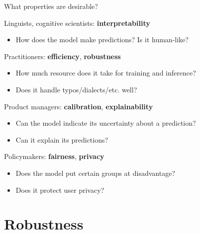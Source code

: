 \documentclass[usenames,dvipsnames,notes,11pt,aspectratio=169,hyperref={colorlinks=true, linkcolor=blue}]{beamer}
\begin{document}
\begin{frame}
    {What properties are desirable?}

    Linguists, cognitive scientists: \textbf{interpretability}\\
    \begin{itemize}
        \item How does the model make predictions? Is it human-like?
    \end{itemize}
    \pause

    Practitioners: \textbf{efficiency}, \textbf{robustness}\\
    \begin{itemize}
        \item How much resource does it take for training and inference?
        \item Does it handle typos/dialects/etc. well?
    \end{itemize}
    \pause

    Product managers: \textbf{calibration}, \textbf{explainability}\\
    \begin{itemize}
        \item Can the model indicate its uncertainty about a prediction? 
        \item Can it explain its predictions?
    \end{itemize}
    \pause

    Policymakers: \textbf{fairness}, \textbf{privacy}\\
    \begin{itemize}
        \item Does the model put certain groups at disadvantage?
        \item Does it protect user privacy?
    \end{itemize}
\end{frame}

\section{Robustness}
\end{document}
